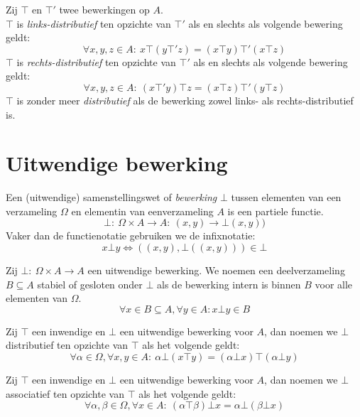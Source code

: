 \documentclass[main.tex]{subfiles}
\begin{document}
\begin{de}
  Zij $\top$ en $\top'$ twee bewerkingen op $A$.\\
  $\top$ is \emph{links-distributief} ten opzichte van $\top'$ als en slechts als volgende bewering geldt:
  \[ \forall x,y,z \in A:\ x \top (y \top' z) = (x\top y) \top' (x \top z)\]
  $\top$ is \emph{rechts-distributief} ten opzichte van $\top'$ als en slechts als volgende bewering geldt:
  \[ \forall x,y,z \in A:\ (x \top' y) \top z = (x\top z) \top' (y \top z)\]
  $\top$ is zonder meer \emph{distributief} als de bewerking zowel links- als rechts-distributief is.
\end{de}

\section{Uitwendige bewerking}
\label{sec:uitwendige-bewerking}

\begin{de}
  Een (uitwendige) samenstellingswet of \emph{bewerking} $\bot$ tussen elementen van een verzameling $\Omega$ en elementin van eenverzameling $A$ is een partiele functie.
  \[ \bot:\ \Omega\times A \rightarrow A:\ (x,y) \rightarrow \bot(x,y)) \]
  Vaker dan de functienotatie gebruiken we de infixnotatie:
  \[ x \bot y \Leftrightarrow  ((x,y),\bot((x,y))) \in \bot \]
\end{de}

\begin{de}
  Zij $\bot:\ \Omega\times A\rightarrow A$ een uitwendige bewerking.
  We noemen een deelverzameling $B\subseteq A$ stabiel of gesloten onder $\bot$ als de bewerking intern is binnen $B$ voor alle elementen van $\Omega$.
  \[ \forall x\in B\subseteq A, \forall y \in A: x \bot y \in B \]
\end{de}

\begin{de}
  Zij $\top$ een inwendige en $\bot$ een uitwendige bewerking voor $A$, dan noemen we $\bot$ distributief ten opzichte van $\top$ als het volgende geldt:
  \[ \forall \alpha \in \Omega, \forall x,y \in A:\ \alpha\bot(x\top y) = (\alpha \bot x)\top(\alpha \bot y) \]
\end{de}

\begin{de}
  Zij $\top$ een inwendige en $\bot$ een uitwendige bewerking voor $A$, dan noemen we $\bot$ associatief ten opzichte van $\top$ als het volgende geldt:
  \[ \forall \alpha,\beta\in \Omega, \forall x \in A:\ (\alpha \top \beta) \bot x = \alpha \bot (\beta \bot x) \]
\end{de}
\end{document}
